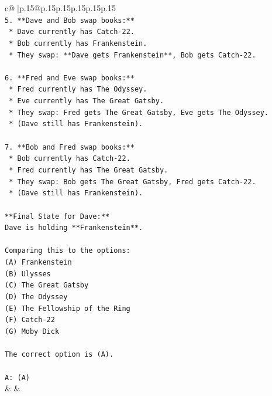 \documentclass{article}
\begin{document}
{\begin{supertabular}{c@{$\;$}|p{.15\linewidth}@{}p{.15\linewidth}p{.15\linewidth}p{.15\linewidth}p{.15\linewidth}p{.15\linewidth}}
{{{\\ 
\texttt{5.  **Dave and Bob swap books:**} \\
\texttt{    *   Dave currently has Catch{-}22.} \\
\texttt{    *   Bob currently has Frankenstein.} \\
\texttt{    *   They swap: **Dave gets Frankenstein**, Bob gets Catch{-}22.} \\
\\ 
\texttt{6.  **Fred and Eve swap books:**} \\
\texttt{    *   Fred currently has The Odyssey.} \\
\texttt{    *   Eve currently has The Great Gatsby.} \\
\texttt{    *   They swap: Fred gets The Great Gatsby, Eve gets The Odyssey.} \\
\texttt{    *   (Dave still has Frankenstein).} \\
\\ 
\texttt{7.  **Bob and Fred swap books:**} \\
\texttt{    *   Bob currently has Catch{-}22.} \\
\texttt{    *   Fred currently has The Great Gatsby.} \\
\texttt{    *   They swap: Bob gets The Great Gatsby, Fred gets Catch{-}22.} \\
\texttt{    *   (Dave still has Frankenstein).} \\
\\ 
\texttt{**Final State for Dave:**} \\
\texttt{Dave is holding **Frankenstein**.} \\
\\ 
\texttt{Comparing this to the options:} \\
\texttt{(A) Frankenstein} \\
\texttt{(B) Ulysses} \\
\texttt{(C) The Great Gatsby} \\
\texttt{(D) The Odyssey} \\
\texttt{(E) The Fellowship of the Ring} \\
\texttt{(F) Catch{-}22} \\
\texttt{(G) Moby Dick} \\
\\ 
\texttt{The correct option is (A).} \\
\\ 
\texttt{A: (A)} \\
            }
        }
    }
    & & \\ \\


\end{supertabular}}
\end{document}
